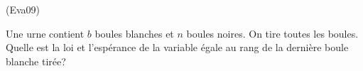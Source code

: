 \begin{tiny}(Eva09)\end{tiny} Une urne contient $b$ boules blanches et $n$ boules noires. On tire toutes les boules. Quelle est la loi et l'espérance de la variable égale au rang de la dernière boule blanche tirée? 